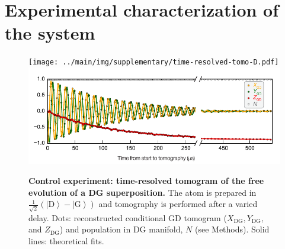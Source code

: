 \documentclass[
						superscriptaddress, 																 amsmath, amssymb,
		 aps,  prb,  
										floatfix,
		linenumbers,
			]{revtex4-1}
\newcommand{\ket}[1]{\left|#1\right>}
\newcommand{\G}{\ket{\mathrm{G}}}
\newcommand{\D}{\ket{\mathrm{D}}}
\begin{document}
\section{Experimental characterization of the system}

\begin{figure}[!b]
\begin{centering}
\ifjournal
	\texttt{[image: ../main/img/supplementary/time-resolved-tomo-D.pdf]}
\else
	\includegraphics[width=140mm]{time-resolved-tomo-D.pdf}
\fi
\caption{\label{fig:time-resolved-tomo-D}
\textbf{Control experiment: time-resolved tomogram of the free evolution of a DG superposition.}
The atom is prepared in $\frac{1}{\sqrt{2}} \left( \D - \G \right)$ and tomography is performed after a varied delay.  Dots: reconstructed conditional GD tomogram ($X_\mathrm{DG},Y_\mathrm{DG},$ and $Z_\mathrm{DG}$) and population in DG manifold,  $N$ (see Methods). Solid lines: theoretical fits.
}
\end{centering}
\end{figure}
\end{document}
